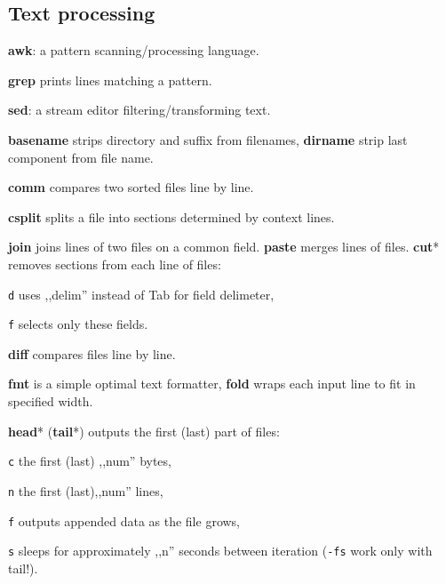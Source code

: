 \subsection*{Text processing}
\begin{enumx}
	\item [\cmd] \textbf{awk}: a pattern scanning/processing language.
	\item [\cmd] \textbf{grep} prints lines matching a pattern.
	\item [\cmd] \textbf{sed}: a stream editor filtering/transforming text.
\end{enumx}


\textbf{basename} strips directory and suffix from filenames, 
\textbf{dirname} strip last component from file name.

\textbf{comm} compares two sorted files line by line.

\textbf{csplit} splits a file into sections determined by context lines.

\textbf{join} joins lines of two files on a common field.
\textbf{paste} merges lines of files.
\textbf{cut}* removes sections from each line of files:
\begin{enumx}
	\item [\texttt{d}] uses ,,delim'' instead of Tab for field delimeter,
	\item [\texttt{f}] selects only these fields.
\end{enumx}

\textbf{diff} compares files line by line.


\textbf{fmt} is a simple optimal text formatter, 
\textbf{fold} wraps each input line to fit in specified width.

\textbf{head}* (\textbf{tail}*) outputs the first (last) part of files:
\begin{enumx}
	\item [\texttt{c}] the first (last) ,,num'' bytes,
	\item [\texttt{n}] the first (last),,num'' lines,
	\item [\texttt{f}] outputs appended data as the file grows,
	\item [\texttt{s}] sleeps for approximately ,,n'' seconds between iteration 
	                   (\texttt{-fs} work only with tail!).
\end{enumx}

